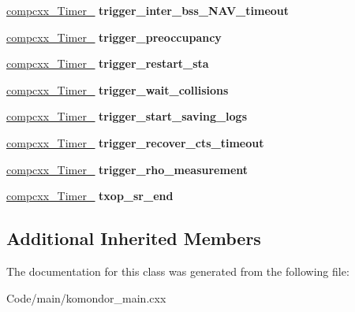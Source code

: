 \begin{DoxyCompactItemize}
\item 
\mbox{\label{classcompcxx__Node__23_ad92933d17d588984bc9213779f1e341c}} 
\hyperlink{classcompcxx__Timer__11}{compcxx\+\_\+\+Timer\+\_} {\bfseries trigger\+\_\+inter\+\_\+bss\+\_\+\+N\+A\+V\+\_\+timeout}
\item 
\mbox{\label{classcompcxx__Node__23_aae56d55696b66c423fd930971daa85f6}} 
\hyperlink{classcompcxx__Timer__12}{compcxx\+\_\+\+Timer\+\_} {\bfseries trigger\+\_\+preoccupancy}
\item 
\mbox{\label{classcompcxx__Node__23_a165e395d729cc8efcd532f4accb99d72}} 
\hyperlink{classcompcxx__Timer__13}{compcxx\+\_\+\+Timer\+\_} {\bfseries trigger\+\_\+restart\+\_\+sta}
\item 
\mbox{\label{classcompcxx__Node__23_a19227e0398185d7e672ded18c9cccc80}} 
\hyperlink{classcompcxx__Timer__14}{compcxx\+\_\+\+Timer\+\_} {\bfseries trigger\+\_\+wait\+\_\+collisions}
\item 
\mbox{\label{classcompcxx__Node__23_afbb83e864d4b0f9568dc06438ab2a90b}} 
\hyperlink{classcompcxx__Timer__15}{compcxx\+\_\+\+Timer\+\_} {\bfseries trigger\+\_\+start\+\_\+saving\+\_\+logs}
\item 
\mbox{\label{classcompcxx__Node__23_aca73e7e1d75d5ec788e9146da4c3a787}} 
\hyperlink{classcompcxx__Timer__16}{compcxx\+\_\+\+Timer\+\_} {\bfseries trigger\+\_\+recover\+\_\+cts\+\_\+timeout}
\item 
\mbox{\label{classcompcxx__Node__23_a94c91b50faf03f00a233d20b10e60cc1}} 
\hyperlink{classcompcxx__Timer__17}{compcxx\+\_\+\+Timer\+\_} {\bfseries trigger\+\_\+rho\+\_\+measurement}
\item 
\mbox{\label{classcompcxx__Node__23_adbdc2f4ce8fc6e6dba0a6b5e0885aed6}} 
\hyperlink{classcompcxx__Timer__18}{compcxx\+\_\+\+Timer\+\_} {\bfseries txop\+\_\+sr\+\_\+end}
\end{DoxyCompactItemize}
\subsection*{Additional Inherited Members}


The documentation for this class was generated from the following file\+:\begin{DoxyCompactItemize}
\item 
Code/main/komondor\+\_\+main.\+cxx\end{DoxyCompactItemize}
